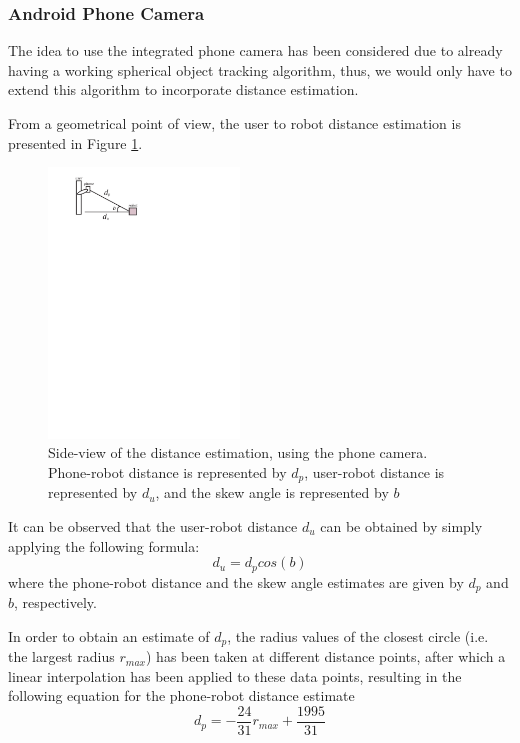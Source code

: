 \documentclass[journal]{IEEEtran}
\let\MYoriglatexcaption\caption
\renewcommand{\caption}[2][\relax]{\MYoriglatexcaption[#2]{#2}}
\begin{document}
\subsubsection{Android Phone Camera}
The idea to use the integrated phone camera has been considered due to already having a working spherical object tracking algorithm, thus, we would only have to extend this algorithm to incorporate distance estimation.

From a geometrical point of view, the user to robot distance estimation is presented in Figure \ref{fig:dist_camera}.
\begin{figure}[!htpb]
\centering
\includegraphics[width=2in]{images/distance_meas}
\caption{Side-view of the distance estimation, using the phone camera. Phone-robot distance is represented by $d_p$, user-robot distance is represented by $d_u$, and the skew angle is represented by $b$}
\label{fig:dist_camera}
\end{figure}

It can be observed that the user-robot distance $d_u$ can be obtained by simply applying the following formula:
\begin{equation}
d_u=d_pcos(b)
\label{eq:dist_estim}
\end{equation}
where the phone-robot distance and the skew angle estimates are given by $d_p$ and $b$, respectively.

In order to obtain an estimate of $d_p$, the radius values of the closest circle (i.e. the largest radius $r_{max}$) has been taken at different distance points, after which a linear interpolation has been applied to these data points, resulting in the following equation for the phone-robot distance estimate
\begin{equation}
d_p=-\frac{24}{31}r_{max}+\frac{1995}{31}
\end{equation}
\end{document}
